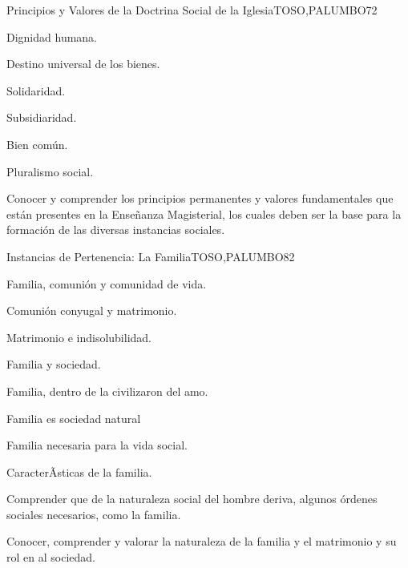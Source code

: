 \begin{syllabus}
\begin{unit}{Principios y Valores de la Doctrina Social de  la Iglesia}{TOSO,PALUMBO}{7}{2}
\begin{topics}
	\item Dignidad humana.
	\item Destino universal de los bienes.
	\item Solidaridad.
	\item Subsidiaridad.
	\item Bien común.
	\item Pluralismo social. 
\end{topics}
\begin{unitgoals}
	\item Conocer y comprender los principios permanentes y valores fundamentales que están presentes en la Enseñanza Magisterial, los cuales deben ser la base para la formación de las diversas instancias sociales.
\end{unitgoals}
\end{unit}

\begin{unit}{Instancias de Pertenencia: La Familia}{TOSO,PALUMBO}{8}{2}
\begin{topics}
	\item Familia, comunión y comunidad de vida.
	\item Comunión conyugal y matrimonio. 
	\item Matrimonio e indisolubilidad.
	\item Familia y sociedad.
	\item Familia, dentro de la civilizaron del amo.
	\item Familia es sociedad natural
	\item Familia necesaria para la vida social.
	\item CaracterÃ­sticas de la familia.
\end{topics}
\begin{unitgoals}
	\item Comprender que de la naturaleza social del hombre deriva, algunos órdenes sociales necesarios, como la familia.
	\item Conocer, comprender y valorar la naturaleza de la familia y el matrimonio y su rol en al sociedad.
\end{unitgoals}
\end{unit}


\end{syllabus}
